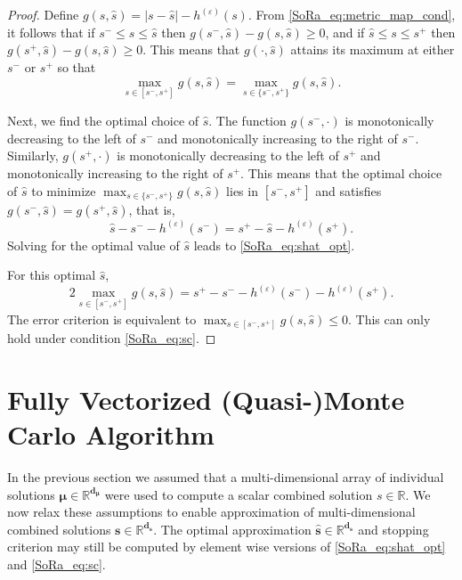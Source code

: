 \documentclass[graybox]{svmult}
\begin{document}
\begin{proof}
    Define $g(s,\hat{s})=\lvert s - \hat{s} \rvert -h^{(\varepsilon)}(s)$. From \eqref{SoRa_eq:metric_map_cond}, it follows that if  $s^- \leq s \leq \hat{s}$ then $g(s^-,\hat{s})-g(s,\hat{s}) \geq 0$, and if $\hat{s} \leq s \leq s^+$ then $g(s^+,\hat{s})-g(s,\hat{s})  \geq 0$. This means that $g(\cdot,\hat{s})$ attains its maximum at either $s^-$ or $s^+$ so that
    \begin{equation*}
        \max_{s \in [s^-,s^+]} g(s,\hat{s}) = \max_{s \in \{s^-,s^+\}} g(s,\hat{s}).
    \end{equation*}
    
    Next, we find the optimal choice of $\hat{s}$.  The function $g(s^-,\cdot)$ is monotonically decreasing to the left of  $s^-$ and monotonically increasing to the right of $s^-$. Similarly, $g(s^+,\cdot)$ is monotonically decreasing to the left of $s^+$ and monotonically increasing to the right of $s^+$. This means that the optimal choice of $\hat{s}$ to minimize $\max_{s \in \{s^-,s^+\}} g(s,\hat{s})$ lies in $[s^-,s^+]$ and satisfies $g(s^-,\hat{s}) = g(s^+,\hat{s})$, that is, 
    $$\hat{s} - s^- - h^{(\varepsilon)}(s^-) = s^+ - \hat{s} - h^{(\varepsilon)}(s^+).$$
    Solving for the optimal value of $\hat{s}$ leads to \eqref{SoRa_eq:shat_opt}.
    
    For this optimal $\hat{s}$, 
    $$2 \max_{s \in [s^-,s^+]} g(s,\hat{s}) =  s^+  -  s^-  - h^{(\varepsilon)}(s^-) - h^{(\varepsilon)}(s^+).$$
    The error criterion is equivalent to $\max_{s \in [s^-,s^+]} g(s,\hat{s}) \le 0 $.  This can only hold under condition  \eqref{SoRa_eq:sc}. 
\end{proof}

\section{Fully Vectorized (Quasi-)Monte Carlo Algorithm} \label{SoRa_sec: Vectorized Implementation}

In the previous section we assumed that a multi-dimensional array of individual solutions $\boldsymbol{\mu} \in \mathbb{R}^{\boldsymbol{d}_{\boldsymbol{\mu}}}$ were used to compute a scalar combined solution $s \in \mathbb{R}$. We now relax these assumptions to enable approximation of multi-dimensional combined solutions $\boldsymbol{s} \in \mathbb{R}^{\boldsymbol{d}_{\boldsymbol{s}}}$. The optimal approximation $\hat{\boldsymbol{s}} \in \mathbb{R}^{\boldsymbol{d}_{\boldsymbol{s}}}$ and stopping criterion may still be computed by element wise versions of \eqref{SoRa_eq:shat_opt} and \eqref{SoRa_eq:sc}. 
\end{document}
